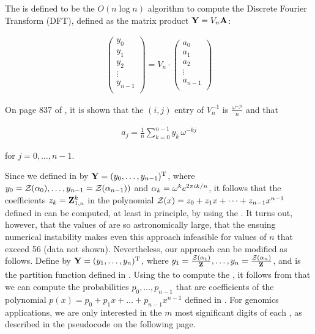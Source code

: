 The \fft is defined to be the $O(n \log n)$
algorithm to compute the Discrete Fourier Transform (DFT), defined
as the matrix product ${\bf Y} = V_n {\bf A}$:

\begin{align}
\label{eq:fftbor:dftMatrix}
\left(
\begin{array}{l}
y_0 \\
y_1 \\
y_2 \\
\vdots \\
y_{n-1} \\
\end{array}
\right)
= V_n \cdot
\left(
\begin{array}{l}
a_0 \\
a_1 \\
a_2 \\
\vdots \\
a_{n-1} \\
\end{array}
\right)
\end{align}

On page 837 of \citep{cormen}, it is shown that the
$(i,j)$ entry of $V_n^{-1}$ is $\frac{\omega^{-j i}}{n}$
and that

\begin{align}
\label{eq:fftbor:aFromY}
a_j = \frac{1}{n} \sum_{k=0}^{n-1} y_k\,\omega^{-kj}
\end{align}

for $j=0,\dots,n-1$.

Since we defined \bfY in  by ${\bf Y} =
(y_0,\dots,y_{n-1})^{\text T}$, where
$y_0={\mathcal Z}_{}(\alpha_0),\dots,y_{n-1}={\mathcal Z}_{}(\alpha_{n-1}))$
and $\alpha_k = \omega^k e^{2 \pi i k/n}$, it follows that the coefficients
$z_k={\bf Z}^{k}_{1,n}$ in the polynomial
${\mathcal Z}_{}(x) = z_0 + z_1 x + \dots + z_{n-1} x^{n-1}$ defined in
 can be computed, at least in principle,
by using the \fft. It turns out, however, that the values of
 are so astronomically large, that the ensuing numerical
instability makes even this approach infeasible for values of $n$
that exceed 56 (data not shown).
Nevertheless, our approach can be modified as follows.
Define \bfY by ${\bf Y} = (y_1,\dots,y_n)^{\text T}$, where
$y_1=\frac{{\mathcal Z}_{}(\alpha_1)}{{\bf Z}^{}_{}},\dots,
y_{n}=\frac{{\mathcal Z}_{}(\alpha_n)}{{\bf Z}^{}_{}}$, and
\fullZ is the partition function defined in .
Using the \fft to compute the \idft, it follows from
 that we can compute the probabilities $p_0,\dots,p_{n-1}$
that are coefficients of the polynomial
$p(x) = p_0 + p_1 x + \dots + p_{n-1}x^{n-1}$
defined in . For genomics applications, we are
only interested in the $m$ most significant digits of each \pk, as described
in the pseudocode on the following page.
\medskip

